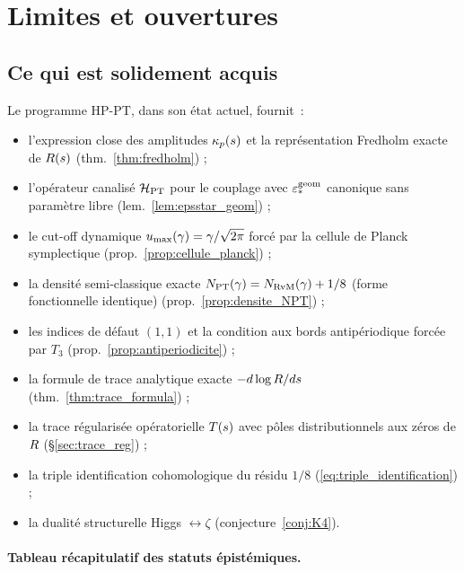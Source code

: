 \section{Limites et ouvertures}
\label{sec:limites_ouvertures}

\subsection{Ce qui est solidement acquis}
\label{sec:acquis}

Le programme HP-PT, dans son état actuel, fournit~:
\begin{itemize}[nosep,leftmargin=*]
\item l'expression close des amplitudes $\kappa_p(s)$ et la
représentation Fredholm exacte de $R(s)$
(thm.~\ref{thm:fredholm}) ;
\item l'opérateur canalisé $\mathcal{H}_{\mathrm{PT}}$ pour le couplage avec
$\varepsilon_{*}^{\mathrm{geom}}$ canonique sans paramètre libre
(lem.~\ref{lem:epsstar_geom}) ;
\item le cut-off dynamique $u_{\max}(\gamma) = \gamma/\sqrt{2\pi}$ forcé
par la cellule de Planck symplectique
(prop.~\ref{prop:cellule_planck}) ;
\item la densité semi-classique exacte
$N_{\mathrm{PT}}(\gamma) = N_{\mathrm{RvM}}(\gamma) + 1/8$ (forme fonctionnelle
identique) (prop.~\ref{prop:densite_NPT}) ;
\item les indices de défaut $(1, 1)$ et la condition aux bords
antipériodique forcée par $T_3$ (prop.~\ref{prop:antiperiodicite}) ;
\item la formule de trace analytique exacte $-d \log R/ds$
(thm.~\ref{thm:trace_formula}) ;
\item la trace régularisée opératorielle $T(s)$ avec pôles
distributionnels aux zéros de $R$ (\S\ref{sec:trace_reg}) ;
\item la triple identification cohomologique du résidu $1/8$
(\eqref{eq:triple_identification}) ;
\item la dualité structurelle Higgs $\leftrightarrow \zeta$
(conjecture~\ref{conj:K4}).
\end{itemize}

\paragraph{Tableau récapitulatif des statuts épistémiques.}

